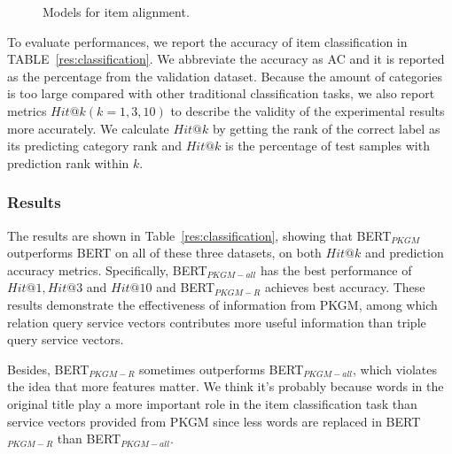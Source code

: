 \begin{figure*}[!htbp]
     \centering
    \caption{Models for item alignment.}
    \label{fig:model-same}
\end{figure*}

To evaluate performances, we report the accuracy of item classification in TABLE~\ref{res:classification}. We abbreviate the accuracy as AC and it is reported as the percentage from the validation dataset. Because the amount of categories is too large compared with other traditional classification tasks, we also report metrics $Hit@k(k=1,3,10)$ to describe the validity of the experimental results more accurately. We calculate $Hit@k$ by getting the rank of the correct label as its predicting category rank and $Hit@k$ is the percentage of test samples with prediction rank within $k$. 

\subsubsection{Results}

The results are shown in Table~\ref{res:classification}, showing that BERT$_{PKGM}$ outperforms BERT on all of these three datasets, on both $Hit@k$ and prediction accuracy metrics. Specifically, BERT$_{PKGM-all}$ has the best performance of $Hit@1, Hit@3$ and $Hit@10$ and BERT$_{PKGM-R}$ achieves best accuracy. 
These results demonstrate the effectiveness of information from PKGM, among which relation query service vectors contributes more useful information than triple query service vectors.

Besides, BERT$_{PKGM-R}$ sometimes outperforms BERT$_{PKGM-all}$, which violates the idea that more features matter. We think it's probably because words in the original title play a more important role in the item classification task than service vectors provided from PKGM since less words are replaced in BERT$_{PKGM-R}$ than BERT$_{PKGM-all}$. 